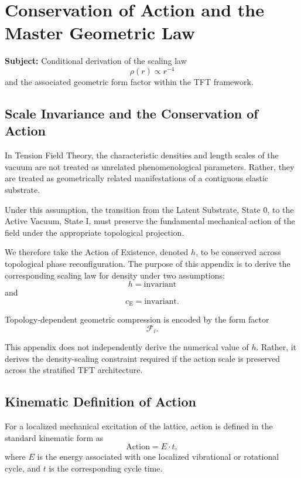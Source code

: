 \chapter{Conservation of Action and the Master Geometric Law}
\label{app:conservation_action}

\noindent\textbf{Subject:} Conditional derivation of the scaling law 
\begin{equation}
    \rho(r) \propto r^{-4}
\end{equation}
and the associated geometric form factor within the TFT framework.

\section{Scale Invariance and the Conservation of Action}
In Tension Field Theory, the characteristic densities and length scales of the vacuum are not treated as unrelated phenomenological parameters. Rather, they are treated as geometrically related manifestations of a contiguous elastic substrate.

Under this assumption, the transition from the Latent Substrate, State 0, to the Active Vacuum, State I, must preserve the fundamental mechanical action of the field under the appropriate topological projection.

We therefore take the Action of Existence, denoted $h$, to be conserved across topological phase reconfiguration. The purpose of this appendix is to derive the corresponding scaling law for density under two assumptions:
\begin{equation}
    h = \text{invariant}
\end{equation}
and
\begin{equation}
    c_{\mathrm{E}} = \text{invariant}.
\end{equation}

Topology-dependent geometric compression is encoded by the form factor
\begin{equation}
    \mathcal{F}_i.
\end{equation}

This appendix does not independently derive the numerical value of $h$. Rather, it derives the density-scaling constraint required if the action scale is preserved across the stratified TFT architecture.

\section{Kinematic Definition of Action}
For a localized mechanical excitation of the lattice, action is defined in the standard kinematic form as
\begin{equation}
    \text{Action} = E \cdot t,
\end{equation}
where $E$ is the energy associated with one localized vibrational or rotational cycle, and $t$ is the corresponding cycle time.

